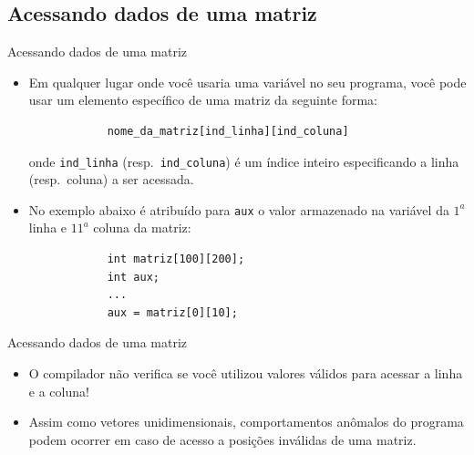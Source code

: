 \documentclass[handout]{beamer}
\newcommand{\cod}[1]{\texttt{#1}}
\begin{document}

\subsection{Acessando dados de uma matriz}

\begin{frame}[fragile]{Acessando dados de uma matriz}

    \begin{itemize}
        \item Em qualquer lugar onde você usaria uma variável no seu programa, você pode usar um elemento específico de uma matriz da seguinte forma:
        
        \begin{verbatim}
            nome_da_matriz[ind_linha][ind_coluna]
        \end{verbatim}
        onde \texttt{ind\_linha} (resp.\ \texttt{ind\_coluna}) é um índice inteiro especificando a linha (resp.\ coluna) a ser acessada.

        \item No exemplo abaixo é atribuído para \cod{aux} o valor armazenado na variável da $1^a$ linha e $11^a$ coluna da matriz:
        \begin{verbatim}
            int matriz[100][200];
            int aux;
            ...
            aux = matriz[0][10];
        \end{verbatim}
    \end{itemize}

\end{frame}

\begin{frame}[fragile]{Acessando dados de uma matriz}

    \begin{itemize}
        \item O compilador não verifica se você utilizou valores válidos para acessar a linha e a coluna!
        \item Assim como vetores unidimensionais, comportamentos anômalos do programa podem ocorrer em caso de acesso a posições inválidas de uma matriz.
    \end{itemize}

\end{frame}
\end{document}
